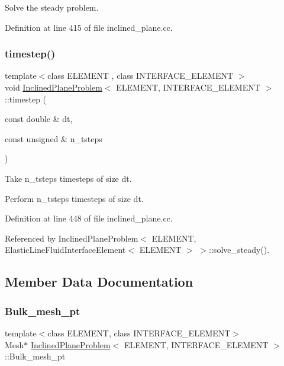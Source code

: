 Solve the steady problem. 



Definition at line 415 of file inclined\+\_\+plane.\+cc.

\mbox{\label{classInclinedPlaneProblem_a74bbd1ccfd3dd82c999a16924c230f51}} 
\subsubsection{\texorpdfstring{timestep()}{timestep()}}
{\footnotesize\ttfamily template$<$class E\+L\+E\+M\+E\+NT , class I\+N\+T\+E\+R\+F\+A\+C\+E\+\_\+\+E\+L\+E\+M\+E\+NT $>$ \\
void \hyperlink{classInclinedPlaneProblem}{Inclined\+Plane\+Problem}$<$ E\+L\+E\+M\+E\+NT, I\+N\+T\+E\+R\+F\+A\+C\+E\+\_\+\+E\+L\+E\+M\+E\+NT $>$\+::timestep (\begin{DoxyParamCaption}\item[{const double \&}]{dt,  }\item[{const unsigned \&}]{n\+\_\+tsteps }\end{DoxyParamCaption})}



Take n\+\_\+tsteps timesteps of size dt. 

Perform n\+\_\+tsteps timesteps of size dt. 

Definition at line 448 of file inclined\+\_\+plane.\+cc.



Referenced by Inclined\+Plane\+Problem$<$ E\+L\+E\+M\+E\+N\+T, Elastic\+Line\+Fluid\+Interface\+Element$<$ E\+L\+E\+M\+E\+N\+T $>$ $>$\+::solve\+\_\+steady().



\subsection{Member Data Documentation}
\mbox{\label{classInclinedPlaneProblem_a20c506fe684dc146424b8ec019239783}} 
\subsubsection{\texorpdfstring{Bulk\+\_\+mesh\+\_\+pt}{Bulk\_mesh\_pt}}
{\footnotesize\ttfamily template$<$class E\+L\+E\+M\+E\+NT, class I\+N\+T\+E\+R\+F\+A\+C\+E\+\_\+\+E\+L\+E\+M\+E\+NT$>$ \\
Mesh$\ast$ \hyperlink{classInclinedPlaneProblem}{Inclined\+Plane\+Problem}$<$ E\+L\+E\+M\+E\+NT, I\+N\+T\+E\+R\+F\+A\+C\+E\+\_\+\+E\+L\+E\+M\+E\+NT $>$\+::Bulk\+\_\+mesh\+\_\+pt\hspace{0.3cm}{\ttfamily [protected]}}



